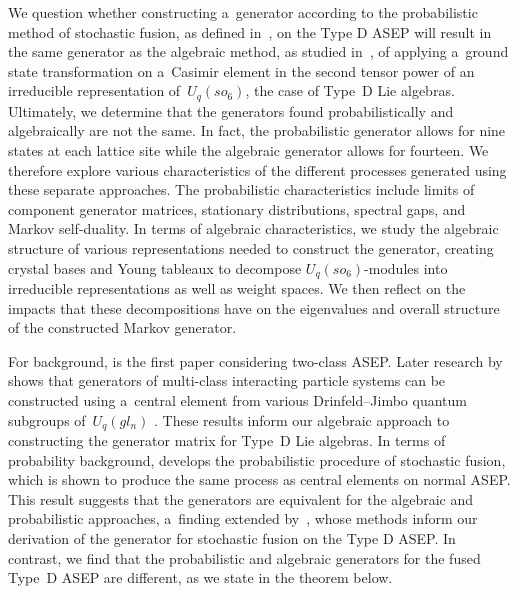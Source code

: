 \documentclass[10pt,a4paper]{amsart}
\numberwithin{equation}{section}
\theoremstyle{definition}
\def\mathcal#1{#1}
\def\mathfrak#1{#1}
\begin{document}
We question whether constructing a~generator according to the probabilistic method of stochastic fusion, as defined in~\cite{kuan2019stochastic}, on the Type D ASEP will result in the same generator as the algebraic method, as studied in~\cite{Carinci2016,Carinci2014,CrampeRagoucyVanicatReview2014,Kuan_2016,Kuan_2018,Kuan_2017,KuanTwoDualities2021}, of applying a~ground state transformation on a~Casimir element in the second tensor power of an irreducible representation of~$\mathcal{U}_q(\mathfrak{so}_6)$, the case of Type~D Lie algebras. Ultimately, we determine that the generators found probabilistically and algebraically are not the same. In fact, the probabilistic generator allows for nine states at each lattice site while the algebraic generator allows for fourteen. We therefore explore various characteristics of the different processes generated using these separate approaches. The probabilistic characteristics include limits of component generator matrices, stationary distributions, spectral gaps, and Markov self-duality. In terms of algebraic characteristics, we study the algebraic structure of various representations needed to construct the generator, creating crystal bases and Young tableaux to decompose $\mathcal{U}_q(\mathfrak{so}_6)$-modules into irreducible representations as well as weight spaces. We then reflect on the impacts that these decompositions have on the eigenvalues and overall structure of the constructed Markov generator.

For background, \cite{10.1214/aop/1176996084} is the first paper considering two-class ASEP. Later research by~\cite{Belitsky_2015,belitskyschutz15,belitsky2016selfdualityshockdynamicsncomponent,Carinci2016,Carinci2014,Kuan_2016, Kuan_2018, Kuan_2017, kuan2020interactingparticlesystemstype, rohr2023type} shows that generators of multi-class interacting particle systems can be constructed using a~central element from various Drinfeld--Jimbo quantum subgroups of~$\mathcal{U}_q(\mathfrak{gl}_n)$ \cite{Drinfeld85, Jimbo85}. These results inform our algebraic approach to constructing the generator matrix for Type~D Lie algebras. In terms of probability background, \cite{kuan2019stochastic} develops the probabilistic procedure of stochastic fusion, which is shown to produce the same process as central elements on normal ASEP. This result suggests that the generators are equivalent for the algebraic and probabilistic approaches, a~finding extended by~\cite{rohr2023type}, whose methods inform our derivation of the generator for stochastic fusion on the Type D ASEP. In contrast, we find that the probabilistic and algebraic generators for the fused Type~D ASEP are different, as we state in the theorem below.
\end{document}
